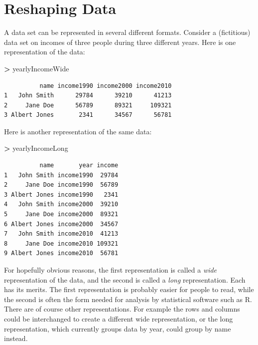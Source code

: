 \documentclass[]{krantz}
\makeatletter
\newenvironment{Shaded}{\begin{snugshade}}{\end{snugshade}}
\newcommand{\NormalTok}[1]{#1}
\newcommand{\OperatorTok}[1]{\textcolor[rgb]{0.43,0.43,0.43}{\textbf{#1}}}
\newcommand{\StringTok}[1]{\textcolor[rgb]{0.5,0.5,0.5}{#1}}
\newenvironment{kframe}{%
\medskip{}
\setlength{\fboxsep}{.8em}
 \def\at@end@of@kframe{}%
 \ifinner\ifhmode%
  \def\at@end@of@kframe{\end{minipage}}%
  \begin{minipage}{\columnwidth}%
 \fi\fi%
 \def\FrameCommand##1{\hskip\@totalleftmargin \hskip-\fboxsep
 \colorbox{shadecolor}{##1}\hskip-\fboxsep
     \hskip-\linewidth \hskip-\@totalleftmargin \hskip\columnwidth}%
 \MakeFramed {\advance\hsize-\width
   \@totalleftmargin\z@ \linewidth\hsize
   \@setminipage}}%
 {\par\unskip\endMakeFramed%
 \at@end@of@kframe}
\renewenvironment{Shaded}{\begin{kframe}}{\end{kframe}}
\makeatother
\begin{document}
\hypertarget{reshaping-data}{%
\section{Reshaping Data}\label{reshaping-data}}

A data set can be represented in several different formats. Consider a (fictitious) data set on incomes of three people during three different years. Here is one representation of the data:

\begin{Shaded}
\begin{Highlighting}[]
\OperatorTok{>}\StringTok{ }\NormalTok{yearlyIncomeWide}
\end{Highlighting}
\end{Shaded}

\begin{verbatim}
          name income1990 income2000 income2010
1   John Smith      29784      39210      41213
2     Jane Doe      56789      89321     109321
3 Albert Jones       2341      34567      56781
\end{verbatim}

Here is another representation of the same data:

\begin{Shaded}
\begin{Highlighting}[]
\OperatorTok{>}\StringTok{ }\NormalTok{yearlyIncomeLong}
\end{Highlighting}
\end{Shaded}

\begin{verbatim}
          name       year income
1   John Smith income1990  29784
2     Jane Doe income1990  56789
3 Albert Jones income1990   2341
4   John Smith income2000  39210
5     Jane Doe income2000  89321
6 Albert Jones income2000  34567
7   John Smith income2010  41213
8     Jane Doe income2010 109321
9 Albert Jones income2010  56781
\end{verbatim}

For hopefully obvious reasons, the first representation is called a \emph{wide} representation of the data, and the second is called a \emph{long} representation. Each has its merits. The first representation is probably easier for people to read, while the second is often the form needed for analysis by statistical software such as R. There are of course other representations. For example the rows and columns could be interchanged to create a different wide representation, or the long representation, which currently groups data by year, could group by name instead.
\end{document}

